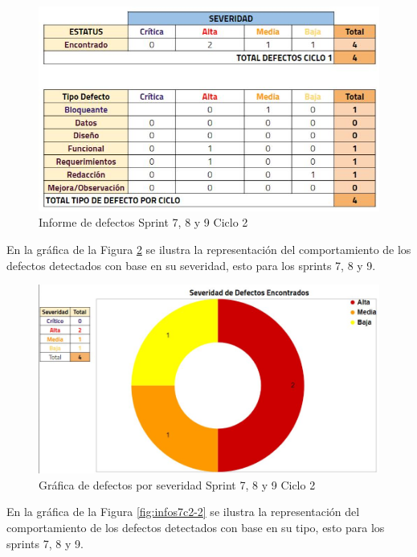 \begin{figure}[H]
	\begin{center}
		\includegraphics[width=.75\textwidth]{images/pruebas/s7c2}
		\caption{Informe de defectos Sprint 7, 8 y 9  Ciclo 2}
		\label{fig:infos7c2}
	\end{center}
\end{figure}

En la gráfica de la Figura \ref{fig:infos7c2-1} se ilustra la representación del comportamiento de los defectos detectados con base en su severidad, esto para los sprints 7, 8 y 9.

\begin{figure}[H]
	\begin{center}
		\includegraphics[width=.75\textwidth]{images/pruebas/s7c2-1}
		\caption{Gráfica de defectos por severidad Sprint 7, 8 y 9  Ciclo 2}
		\label{fig:infos7c2-1}
	\end{center}
\end{figure}

En la gráfica de la Figura \ref{fig:infos7c2-2} se ilustra la representación del comportamiento de los defectos detectados con base en su tipo, esto para los sprints 7, 8 y 9.

